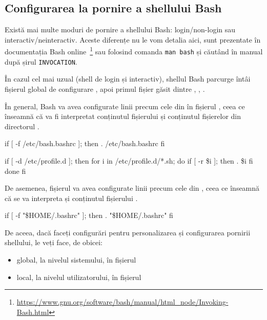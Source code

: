 \subsection{Configurarea la pornire a shellului Bash}
\label{sec:cli:shell-start:config}

Există mai multe moduri de pornire a shellului Bash: login/non-login sau
interactiv/neinteractiv. Aceste diferențe nu le vom detalia aici, sunt
prezentate în documentația Bash online~\footnote{\url{https://www.gnu.org/software/bash/manual/html\_node/Invoking-Bash.html}} sau folosind comanda \texttt{man bash} și căutând în manual după șirul \texttt{INVOCATION}.

În cazul cel mai uzual (shell de login și interactiv), shellul Bash parcurge
întâi fișierul global de configurare , apoi primul fișier găsit dintre
, , .

În general, Bash va avea configurate linii precum cele din  în fișierul
, ceea ce înseamnă că va fi interpretat conținutul fișierului
 și conținutul fișierelor din directorul .

\begin{screen}[caption={Secvență de configurare Bash (/etc/profile)},label={lst:cli:etc-profile}]
        if [ -f /etc/bash.bashrc ]; then
            . /etc/bash.bashrc
        fi


if [ -d /etc/profile.d ]; then
    for i in /etc/profile.d/*.sh; do
        if [ -r \$i ]; then
            . \$i
        fi
    done
fi
\end{screen}

De asemenea, fișierul  va avea configurate linii precum cele din , ceea ce înseamnă că se va interpreta și conținutul fișierului .

\begin{screen}[caption={Secvență de configurare Bash (~/.bashrc)},label={lst:cli:home-profile}]
    if [ -f "\$HOME/.bashrc" ]; then
        . "\$HOME/.bashrc"
    fi
\end{screen}

De aceea, dacă faceți configurări pentru personalizarea și configurarea pornirii shellului, le veți face, de obicei:

\begin{itemize}
  \item global, la nivelul sistemului, în fișierul 
  \item local, la nivelul utilizatorului, în fișierul 
\end{itemize}


